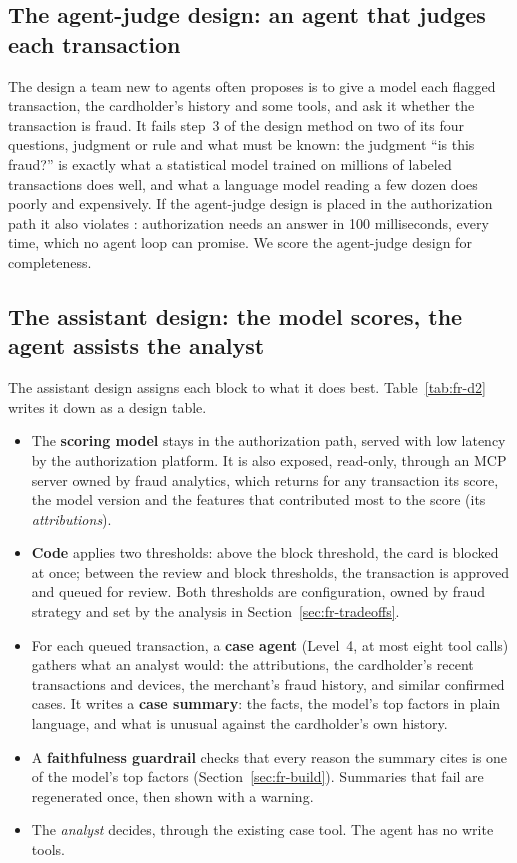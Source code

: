 \subsection{The agent-judge design: an agent that judges each transaction}

The design a team new to agents often proposes is to give a model each flagged transaction, the cardholder's history and some tools, and ask it whether the transaction is fraud. It fails step~3 of the design method on two of its four questions, judgment or rule and what must be known: the judgment ``is this fraud?'' is exactly what a statistical model trained on millions of labeled transactions does well, and what a language model reading a few dozen does poorly and expensively. If the agent-judge design is placed in the authorization path it also violates : authorization needs an answer in 100 milliseconds, every time, which no agent loop can promise. We score the agent-judge design for completeness.

\subsection{The assistant design: the model scores, the agent assists the analyst}

The assistant design assigns each block to what it does best. Table~\ref{tab:fr-d2} writes it down as a design table.
\begin{itemize}[itemsep=1pt]
  \item The \textbf{scoring model} stays in the authorization path, served with low latency by the authorization platform. It is also exposed, read-only, through an MCP server owned by fraud analytics, which returns for any transaction its score, the model version and the features that contributed most to the score (its \emph{attributions}).
  \item \textbf{Code} applies two thresholds: above the block threshold, the card is blocked at once; between the review and block thresholds, the transaction is approved and queued for review. Both thresholds are configuration, owned by fraud strategy and set by the analysis in Section~\ref{sec:fr-tradeoffs}.
  \item For each queued transaction, a \textbf{case agent} (Level~4, at most eight tool calls) gathers what an analyst would: the attributions, the cardholder's recent transactions and devices, the merchant's fraud history, and similar confirmed cases. It writes a \textbf{case summary}: the facts, the model's top factors in plain language, and what is unusual against the cardholder's own history.
  \item A \textbf{faithfulness guardrail} checks that every reason the summary cites is one of the model's top factors (Section~\ref{sec:fr-build}). Summaries that fail are regenerated once, then shown with a warning.
  \item The \emph{analyst} decides, through the existing case tool. The agent has no write tools.
\end{itemize}

